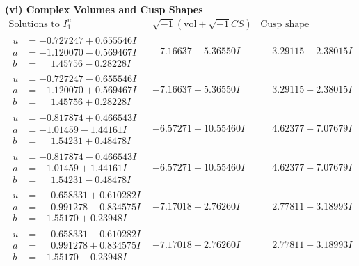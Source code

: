 \documentclass[1p]{elsarticle_modified}
\theoremstyle{definition}
\newcommand{\I}{\sqrt{-1}}
\begin{document}
\newpage\flushleft \textbf{(vi) Complex Volumes and Cusp Shapes}
$$\begin{array}{c|c|c}  
\text{Solutions to }I^u_{1}& \I (\text{vol} + \sqrt{-1}CS) & \text{Cusp shape}\\
 \hline 
\begin{aligned}
u &= -0.727247 + 0.655546 I \\
a &= -1.120070 - 0.569467 I \\
b &= \phantom{-}1.45756 - 0.28228 I\end{aligned}
 & -7.16637 + 5.36550 I & \phantom{-}3.29115 - 2.38015 I \\ \hline\begin{aligned}
u &= -0.727247 - 0.655546 I \\
a &= -1.120070 + 0.569467 I \\
b &= \phantom{-}1.45756 + 0.28228 I\end{aligned}
 & -7.16637 - 5.36550 I & \phantom{-}3.29115 + 2.38015 I \\ \hline\begin{aligned}
u &= -0.817874 + 0.466543 I \\
a &= -1.01459 - 1.44161 I \\
b &= \phantom{-}1.54231 + 0.48478 I\end{aligned}
 & -6.57271 - 10.55460 I & \phantom{-}4.62377 + 7.07679 I \\ \hline\begin{aligned}
u &= -0.817874 - 0.466543 I \\
a &= -1.01459 + 1.44161 I \\
b &= \phantom{-}1.54231 - 0.48478 I\end{aligned}
 & -6.57271 + 10.55460 I & \phantom{-}4.62377 - 7.07679 I \\ \hline\begin{aligned}
u &= \phantom{-}0.658331 + 0.610282 I \\
a &= \phantom{-}0.991278 - 0.834575 I \\
b &= -1.55170 + 0.23948 I\end{aligned}
 & -7.17018 + 2.76260 I & \phantom{-}2.77811 - 3.18993 I \\ \hline\begin{aligned}
u &= \phantom{-}0.658331 - 0.610282 I \\
a &= \phantom{-}0.991278 + 0.834575 I \\
b &= -1.55170 - 0.23948 I\end{aligned}
 & -7.17018 - 2.76260 I & \phantom{-}2.77811 + 3.18993 I \\ \hline\begin{aligned}

\end{aligned}
\end{array}$$
\end{document}
